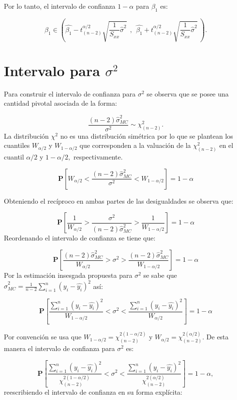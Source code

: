 \documentclass[
  a4paper,
  oneside,
  openany]{book}
\begin{document}
Por lo tanto, el intervalo de confianza \(1-\alpha\) para \(\beta_{1}\) es:

\[\beta_{1} \in \left( \hat{\beta_{1}}-t^{\alpha/2}_{(n-2)} \sqrt{\frac{1}{S_{xx}}\hat{\sigma}^2} \ \ , \ \ \hat{\beta_{1}}+t^{\alpha/2}_{(n-2)} \sqrt{\frac{1}{S_{xx}}\hat{\sigma}^2} \  \right).\]

\hypertarget{intervalo-para-sigma2}{%
\section{\texorpdfstring{Intervalo para \(\sigma^2\)}{Intervalo para \textbackslash sigma\^{}2}}\label{intervalo-para-sigma2}}

Para construir el intervalo de confianza para \(\sigma^2\) se observa que se posee una cantidad pivotal asociada de la forma:

\[\frac{(n-2)\hat{\sigma}^2_{MC}}{\sigma^2}\sim \chi^2_{(n-2)}.\]
La distribución \(\chi^2\) no es una distribución simétrica por lo que se plantean los cuantiles \(W_{\alpha/2}\) y \(W_{1-\alpha/2}\) que corresponden a la valuación de la \(\chi^2_{(n-2)}\) en el cuantil \(\alpha/2\) y \(1-\alpha/2,\) respectivamente.

\[\mathbf{P}\left[W_{\alpha/2}<\frac{(n-2)\hat{\sigma}^2_{MC}}{\sigma^2}< W_{1-\alpha/2}\right]=1-\alpha\]

Obteniendo el recíproco en ambas partes de las desigualdades se observa que:

\[\mathbf{P}\left[\frac{1}{W_{\alpha/2}}>\frac{\sigma^2}{(n-2)\hat{\sigma}^2_{MC}}>\frac{1} {W_{1-\alpha/2}}\right]=1-\alpha\]
Reordenando el intervalo de confianza se tiene que:

\[\mathbf{P}\left[\frac{(n-2)\hat{\sigma}^2_{MC}}{W_{\alpha/2}}>\sigma^2>\frac{(n-2)\hat{\sigma}^2_{MC}} {W_{1-\alpha/2}}\right]=1-\alpha\]
Por la estimación insesgada propuesta para \(\sigma^2\) se sabe que \(\hat{\sigma}^2_{MC}=\frac{1}{n-2}\sum_{i=1}^{n}(y_i-\hat{y_{i}})^2\) así:

\[\mathbf{P}\left[\frac{\sum_{i=1}^{n}(y_i-\hat{y_{i}})^2}{W_{1-\alpha/2}}<\sigma^2<\frac{\sum_{i=1}^{n}(y_i-\hat{y_{i}})^2} {W_{\alpha/2}}\right]=1-\alpha\]

Por convención se usa que \(W_{1-\alpha/2}=\chi^{2(1-\alpha/2)}_{(n-2)}\) y \(W_{\alpha/2}=\chi^{2(\alpha/2)}_{(n-2)}.\) De esta manera el intervalo de confianza para \(\sigma^2\) es:

\[\mathbf{P}\left[\frac{\sum_{i=1}^{n}(y_i-\hat{y_{i}})^2}{\chi^{2(1-\alpha/2)}_{(n-2)}}<\sigma^2<\frac{\sum_{i=1}^{n}(y_i-\hat{y_{i}})^2} {\chi^{2(\alpha/2)}_{(n-2)}}\right]=1-\alpha,\]
reescribiendo el intervalo de confianza en su forma explícita:
\end{document}
